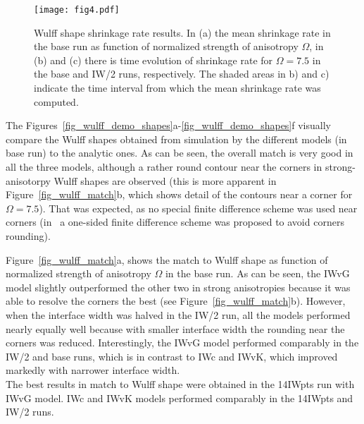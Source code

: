 \begin{figure}
	\centering
	\texttt{[image: fig4.pdf]}
	\caption{Wulff shape shrinkage rate results. In (a) the mean shrinkage rate in the base run as function of normalized strength of anisotropy $\Omega$, in (b) and (c) there is time evolution of shrinkage rate for $\Omega=7.5$ in the base and IW/2 runs, respectively. The shaded areas in b) and c) indicate the time interval from which the mean shrinkage rate was computed.}
	\label{fig_wulff_shrrate}
\end{figure}

The Figures~\ref{fig_wulff_demo_shapes}a-\ref{fig_wulff_demo_shapes}f visually compare the Wulff shapes obtained from simulation by the different models (in base run) to the analytic ones. As can be seen, the overall match is very good in all the three models, although a rather round contour near the corners in strong-anisotorpy Wulff shapes are observed (this is more apparent in Figure~\ref{fig_wulff_match}b, which shows detail of the contours near a corner for $\Omega=7.5$). That was expected, as no special finite difference scheme was used near corners (in~\cite{Eggleston2001} a one-sided finite difference scheme was proposed to avoid corners rounding). 

Figure~\ref{fig_wulff_match}a, shows the match to Wulff shape as function of normalized strength of anisotropy $\Omega$ in the base run. As can be seen, the IWvG model slightly outperformed the other two in strong anisotropies because it was able to resolve the corners the best (see Figure~\ref{fig_wulff_match}b). However, when the interface width was halved in the IW/2 run, all the models performed nearly equally well because with smaller interface width the rounding near the corners was reduced. Interestingly, the IWvG model performed comparably in the IW/2 and base runs, which is in contrast to IWc and IWvK, which improved markedly with narrower interface width. \\
The best results in match to Wulff shape were obtained in the 14IWpts run with IWvG model. IWc and IWvK models performed comparably in the 14IWpts and IW/2 runs.

